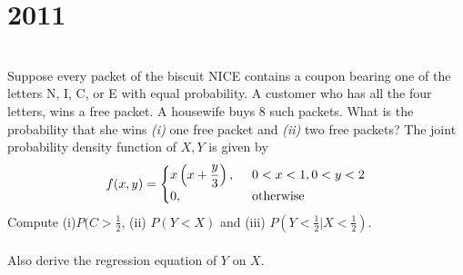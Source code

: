 \section*{2011}
\vspace{-.5cm}
\hrulefill \\\smallskip
{} Suppose every packet of the biscuit NICE contains a coupon bearing one of the letters N, I, C, or E with equal probability. A customer who has all the four letters, wins a free packet. A housewife buys 8 such packets. What is the probability that she wins \emph{(i)} one free packet and \emph{(ii)} two free packets?
\myline
{} The joint probability density function of $X,Y$ is given by 
\[f(x,y) = \begin{cases} x\left(x + \dfrac{y}{3}\right), \enskip &0<x<1,0 < y < 2 \\
0, & \text{otherwise} \end{cases} \] 
Compute (i)$P(C>\frac{1}{2}$, (ii) $P(Y<X)$ and (iii) $P(Y<\frac{1}{2}| X < \frac{1}{2})$.\\\\
Also derive the regression equation of $Y$ on $X$.

